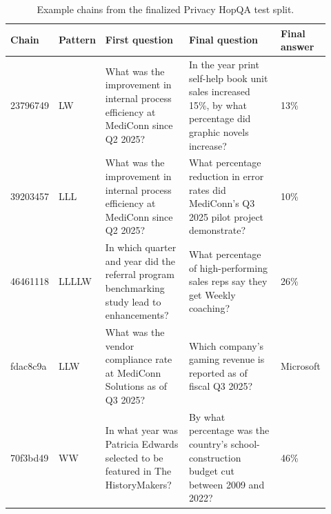 \begin{table}[t]
\centering
\small
\begin{tabular}{p{0.10\linewidth}p{0.09\linewidth}p{0.28\linewidth}p{0.35\linewidth}p{0.10\linewidth}}
\toprule
\textbf{Chain} & \textbf{Pattern} & \textbf{First question} & \textbf{Final question} & \textbf{Final answer} \\
\midrule
23796749 & LW & What was the improvement in internal process efficiency at MediConn since Q2 2025? & In the year print self-help book unit sales increased 15\%, by what percentage did graphic novels increase? & 13\% \\
39203457 & LLL & What was the improvement in internal process efficiency at MediConn since Q2 2025? & What percentage reduction in error rates did MediConn's Q3 2025 pilot project demonstrate? & 10\% \\
46461118 & LLLLW & In which quarter and year did the referral program benchmarking study lead to enhancements? & What percentage of high-performing sales reps say they get Weekly coaching? & 26\% \\
fdac8c9a & LLW & What was the vendor compliance rate at MediConn Solutions as of Q3 2025? & Which company's gaming revenue is reported as of fiscal Q3 2025? & Microsoft \\
70f3bd49 & WW & In what year was Patricia Edwards selected to be featured in The HistoryMakers? & By what percentage was the country's school-construction budget cut between 2009 and 2022? & 46\% \\
\bottomrule
\end{tabular}
\caption{Example chains from the finalized Privacy HopQA test split.}
\label{tab:privacy_hopqa_test_examples}
\end{table}

